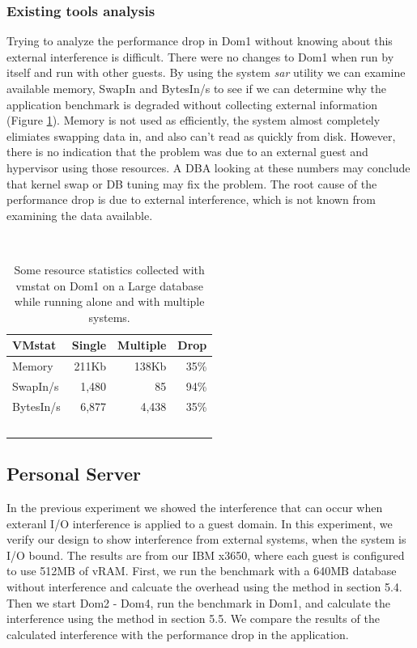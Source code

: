 \subsubsection{Existing tools analysis}
\indent Trying to analyze the performance drop in Dom1 without knowing about this external interference is difficult.  
There were no changes to Dom1 when run by itself and run with other guests.  
By using the system \emph{sar} utility we can examine available memory, SwapIn and BytesIn/s to see if we can determine why the application benchmark is degraded without collecting external information (Figure \ref{fig:vmstat}).  
Memory is not used as efficiently, the system almost completely elimiates swapping data in, and also can't read as quickly from disk.  
However, there is no indication that the problem was due to an external guest and hypervisor using those resources.
A DBA looking at these numbers may conclude that kernel swap or DB tuning may fix the problem.  
The root cause of the performance drop is due to external interference, which is not known from examining the data available.

\begin{table}[h]
  \begin{tabular}{ l | r | r | r }
    VMstat & Single & Multiple & Drop \\ \hline
	Memory & 211Kb & 138Kb & 35\% \\
	SwapIn/s & 1,480 & 85 & 94\% \\
	BytesIn/s & 6,877 & 4,438 & 35\% \\
  \end{tabular}
\caption{Some resource statistics collected with vmstat on Dom1 on a Large database while running alone and with multiple systems.} 
\label{fig:vmstat}
\end{table}

\subsection{Personal Server}
In the previous experiment we showed the interference that can occur when exteranl I/O interference is applied to a guest domain.
In this experiment, we verify our design to show interference from external systems, when the system is I/O bound.
The results are from our IBM x3650, where each guest is configured to use 512MB of vRAM.
First, we run the benchmark with a 640MB database without interference and calcuate the overhead using the method in section 5.4.  
Then we start Dom2 - Dom4, run the benchmark in Dom1, and calculate the interference using the method in section 5.5.  
We compare the results of the calculated interference with the performance drop in the application.

